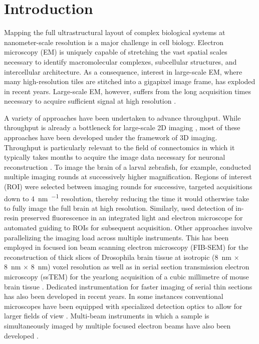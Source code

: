 \section{Introduction}
\label{sec:2.1_intro}

Mapping the full ultrastructural layout of complex biological systems at nanometer-scale resolution is a major challenge in cell biology. Electron microscopy (EM) is uniquely capable of stretching the vast spatial scales necessary to identify macromolecular complexes, subcellular structures, and intercellular architecture. As a consequence, interest in large-scale EM, where many high-resolution tiles are stitched into a gigapixel image frame, has exploded in recent years. Large-scale EM, however, suffers from the long acquisition times necessary to acquire sufficient signal at high resolution \cite{peddie2014exploring}.

A variety of approaches have been undertaken to advance throughput. While throughput is already a bottleneck for large-scale 2D imaging \cite{kuipers2015scanning}, most of these approaches have been developed under the framework of 3D imaging. Throughput is particularly relevant to the field of connectomics in which it typically takes months to acquire the image data necessary for neuronal reconstruction \cite{kornfeld2018progress}. To image the brain of a larval zebrafish, for example, \textcite{hildebrand2017whole} conducted multiple imaging rounds at successively higher magnification. Regions of interest (ROI) were selected between imaging rounds for successive, targeted acquisitions down to \SI{4}{\nano\meter\per\pixel} resolution, thereby reducing the time it would otherwise take to fully image the full brain at high resolution. Similarly, \textcite{delpiano2018automated} used detection of in-resin preserved fluorescence in an integrated light and electron microscope for automated guiding to ROIs for subsequent acquisition. Other approaches involve parallelizing the imaging load across multiple instruments. This has been employed in focused ion beam scanning electron microscopy (FIB-SEM) for the reconstruction of thick slices of Drosophila brain tissue at isotropic (\SI{8}{\nano\meter} $\times$ \SI{8}{\nano\meter} $\times$ \SI{8}{\nano\meter}) voxel resolution \cite{hayworth2015ultrastructurally} as well as in serial section transmission electron microscopy (ssTEM) for the yearlong acquisition of a cubic millimetre of mouse brain tissue \cite{yin2019petascale}. Dedicated instrumentation for faster imaging of serial thin sections has also been developed in recent years. In some instances conventional microscopes have been equipped with specialized detection optics to allow for larger fields of view \cite{bock2011network, zheng2018complete}. Multi-beam instruments in which a sample is simultaneously imaged by multiple focused electron beams have also been developed \cite{eberle2015high, ren2016transmission}.

